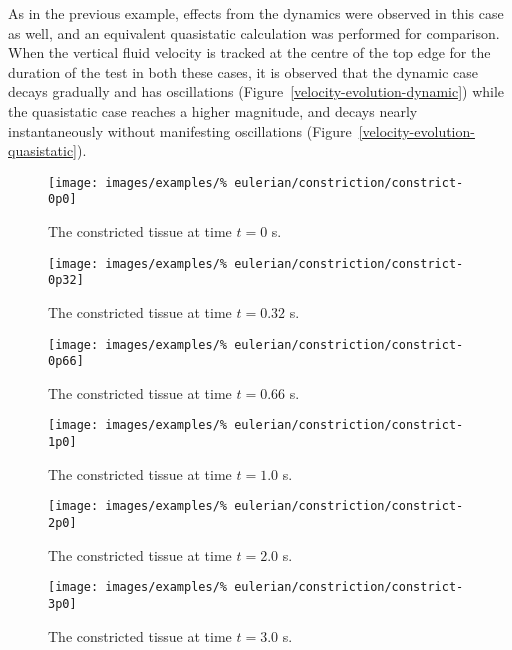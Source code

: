 As in the previous example, effects from the dynamics were observed in
this case as well, and an equivalent quasistatic calculation was
performed for comparison. When the vertical fluid velocity is tracked
at the centre of the top edge for the duration of the test in both
these cases, it is observed that the dynamic case decays gradually and
has oscillations (Figure~\ref{velocity-evolution-dynamic}) while the
quasistatic case reaches a higher magnitude, and decays nearly
instantaneously without manifesting oscillations
(Figure~\ref{velocity-evolution-quasistatic}).

\begin{figure}[!hptb]
  \centering
  \texttt{[image: images/examples/\%
    eulerian/constriction/constrict-0p0]}
  \caption{The constricted tissue at time $t=0$ s.} 
  \label{constrict-image-0p0}
\end{figure}

\begin{figure}[!hptb]
  \centering
  \texttt{[image: images/examples/\%
    eulerian/constriction/constrict-0p32]}
  \caption{The constricted tissue at time $t=0.32$ s.} 
  \label{constrict-image-0p32}
\end{figure}

\begin{figure}[!hptb]
  \centering
  \texttt{[image: images/examples/\%
    eulerian/constriction/constrict-0p66]}
  \caption{The constricted tissue at time $t=0.66$ s.} 
  \label{constrict-image-0p66}
\end{figure}

\begin{figure}[!hptb]
  \centering
  \texttt{[image: images/examples/\%
    eulerian/constriction/constrict-1p0]}
  \caption{The constricted tissue at time $t=1.0$ s.} 
  \label{constrict-image-1p0}
\end{figure}

\begin{figure}[!hptb]
  \centering
  \texttt{[image: images/examples/\%
    eulerian/constriction/constrict-2p0]}
  \caption{The constricted tissue at time $t=2.0$ s.} 
  \label{constrict-image-2p0}
\end{figure}

\begin{figure}[!hptb]
  \centering
  \texttt{[image: images/examples/\%
    eulerian/constriction/constrict-3p0]}
  \caption{The constricted tissue at time $t=3.0$ s.} 
  \label{constrict-image-3p0}
\end{figure}

